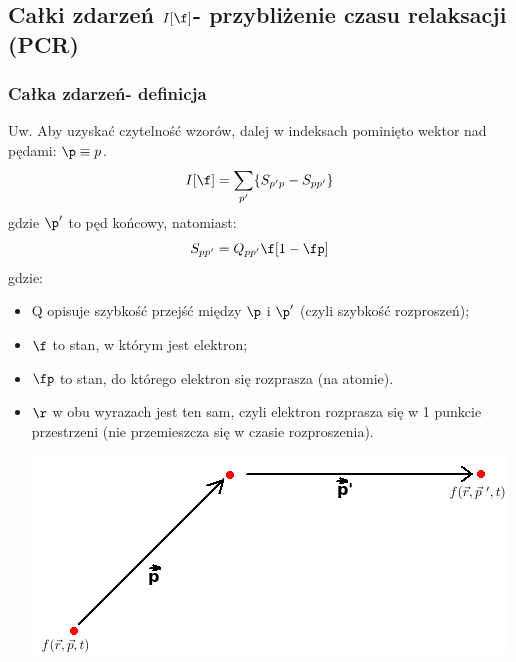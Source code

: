 \subsection{Całki zdarzeń $I[\f]$- przybliżenie czasu relaksacji (PCR)}
\subsubsection{Całka zdarzeń- definicja}
Uw. Aby uzyskać czytelność wzorów, dalej w indeksach pominięto wektor nad pędami: $\p\equiv p$.
\begin{equation}I[\f]=\sum_{p'}\{S_{p'p}-S_{pp'}\}\end{equation}
gdzie $\p'$ to pęd końcowy, natomiast:
\begin{equation}S_{pp'}=Q_{pp'}\f[1-\fp]\end{equation}
gdzie:\\
\begin{itemize}
\item Q opisuje szybkość przejść między $\p$ i $\p'$ (czyli szybkość rozproszeń);
\item$\f$ to stan, w którym jest elektron;
\item$\fp$ to stan, do którego elektron się rozprasza (na atomie).
\item$\r$ w obu wyrazach jest ten sam, czyli elektron rozprasza się w 1 punkcie przestrzeni (nie przemieszcza się w czasie rozproszenia).
\begin{center}\includegraphics[scale=0.5]{obrazki/wykl_7_obrazek6.png}\end{center}
\end{itemize}
